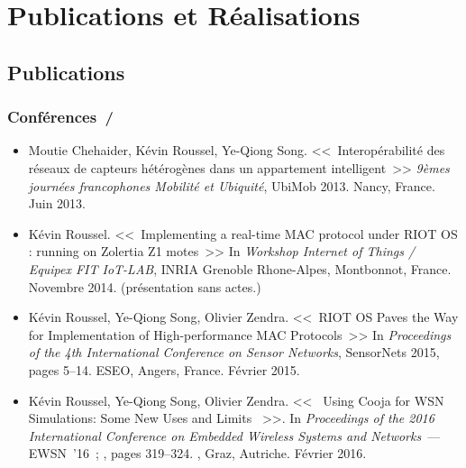 
\chapter{Publications et Réalisations}
\label{AnxPubReal}


\vspace{-0.5cm}


\section*{Publications}
\label{SecAnxPubSci}


\subsection*{Conférences~/ }

\begin{itemize}

\item Moutie Chehaider, Kévin Roussel, Ye-Qiong Song.
<<~Interopérabilité des réseaux de capteurs hétérogènes dans
un appartement intelligent~>>
\textit{9èmes journées francophones Mobilité et Ubiquité}, UbiMob 2013.
Nancy, France. Juin 2013.

\item Kévin Roussel.
<<~Implementing a real-time MAC protocol under RIOT OS : running on
Zolertia Z1 motes~>>
In \textit{Workshop Internet of Things / Equipex FIT IoT-LAB},
INRIA Grenoble Rhone-Alpes, Montbonnot, France. Novembre 2014.
(présentation sans actes.)

\item Kévin Roussel, Ye-Qiong Song, Olivier Zendra.
<<~RIOT OS Paves the Way for Implementation of High-performance
MAC Protocols~>>
In \textit{Proceedings of the 4th International Conference
on Sensor Networks}, SensorNets 2015, pages 5--14.
ESEO, Angers, France. Février 2015.

\item Kévin Roussel, Ye-Qiong Song, Olivier Zendra.
<<~ Using Cooja for WSN Simulations: Some New Uses and Limits ~>>.
In \textit{Proceedings of the 2016 International Conference on Embedded
Wireless Systems and Networks}~--- EWSN~'16~; ,
pages 319--324.
, Graz, Autriche. Février 2016.

\end{itemize}


